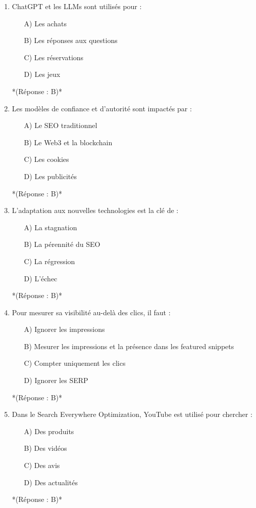 \documentclass[12pt,a4paper,twoside]{report}
\begin{document}
\begin{enumerate}
    \item ChatGPT et les LLMs sont utilisés pour :
    \begin{itemize}
        \item[A)] Les achats
        \item[B)] Les réponses aux questions
        \item[C)] Les réservations
        \item[D)] Les jeux
    \end{itemize}
    *(Réponse : B)*

    \item Les modèles de confiance et d'autorité sont impactés par :
    \begin{itemize}
        \item[A)] Le SEO traditionnel
        \item[B)] Le Web3 et la blockchain
        \item[C)] Les cookies
        \item[D)] Les publicités
    \end{itemize}
    *(Réponse : B)*

    \item L'adaptation aux nouvelles technologies est la clé de :
    \begin{itemize}
        \item[A)] La stagnation
        \item[B)] La pérennité du SEO
        \item[C)] La régression
        \item[D)] L'échec
    \end{itemize}
    *(Réponse : B)*

    \item Pour mesurer sa visibilité au-delà des clics, il faut :
    \begin{itemize}
        \item[A)] Ignorer les impressions
        \item[B)] Mesurer les impressions et la présence dans les featured snippets
        \item[C)] Compter uniquement les clics
        \item[D)] Ignorer les SERP
    \end{itemize}
    *(Réponse : B)*

    \item Dans le Search Everywhere Optimization, YouTube est utilisé pour chercher :
    \begin{itemize}
        \item[A)] Des produits
        \item[B)] Des vidéos
        \item[C)] Des avis
        \item[D)] Des actualités
    \end{itemize}
    *(Réponse : B)*


\end{enumerate}
\end{document}
